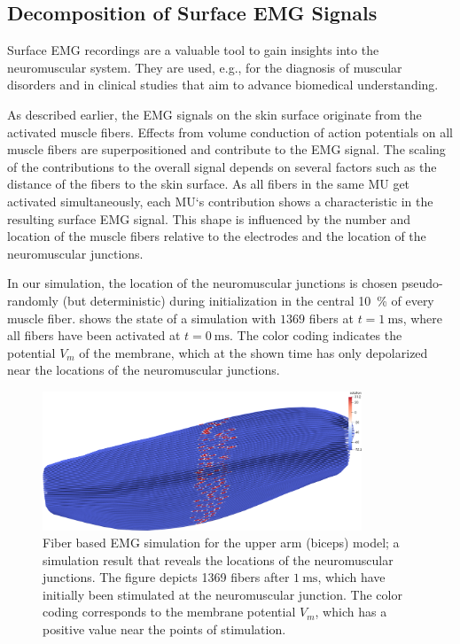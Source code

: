 \subsection{Decomposition of Surface EMG Signals}\label{sec:simfiber_decomposition}

Surface EMG recordings are a valuable tool to gain insights into the neuromuscular system. They are used, e.g., for the diagnosis of muscular disorders and in clinical studies that aim to advance biomedical understanding.

As described earlier, the EMG signals on the skin surface originate from the activated muscle fibers. Effects from volume conduction of action potentials on all muscle fibers are superpositioned and contribute to the EMG signal. The scaling of the contributions to the overall signal depends on several factors such as the distance of the fibers to the skin surface. As all fibers in the same MU get activated simultaneously, each MU`s contribution shows a characteristic  in the resulting surface EMG signal. This shape is influenced by the number and location of the muscle fibers relative to the electrodes and the location of the neuromuscular junctions.

In our simulation, the location of the neuromuscular junctions is chosen pseudo-randomly (but deterministic) during initialization in the central \SI{10}{\percent} of every muscle fiber.  shows the state of a simulation with $1369$ fibers at $t=\SI{1}{\ms}$, where all fibers have been activated at $t=\SI{0}{\ms}$. The color coding indicates the potential $V_m$ of the membrane, which at the shown time has only depolarized near the locations of the neuromuscular junctions.

\begin{figure}
  \centering%
  \includegraphics[width=0.85\textwidth]{images/results/application/emg_video_37_junctions.png}%
  \caption{Fiber based EMG simulation for the upper arm (biceps) model; a simulation result that reveals the locations of the neuromuscular junctions. The figure depicts 1369 fibers after $\SI{1}{\ms}$, which have initially been stimulated at the neuromuscular junction. The color coding corresponds to the membrane potential $V_m$, which has a positive value near the points of stimulation.}%
  \label{fig:emg_video_37_junctions}%
\end{figure}

